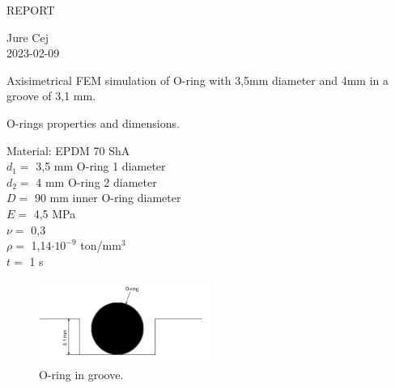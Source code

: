 \documentclass[10pt,a4paper,oneside,fleqn]{article}
\begin{document}
	
	
	\begin{center}
		REPORT
		
		Jure Cej\\
		2023-02-09
	\end{center}


Axisimetrical FEM simulation of O-ring with 3,5mm diameter and 4mm in a groove of 3,1 mm.



O-rings properties and dimensions.

Material: EPDM 70 ShA \\
$d_1 =$ 3,5 mm O-ring 1 diameter\\
$d_2 =$ 4 mm O-ring 2 diameter\\
$D =$ 90 mm inner O-ring diameter\\
$E =$ 4,5 MPa\\
$\nu =$ 0,3 \\
$\rho = $ 1,14$\cdot10^{-9}$ ton/mm$^3$ \\
$t =$ 1 s


\begin{figure}[h]
	\centering
	\includegraphics[width=0.5\textwidth]{2023-02-09-O-ring}
	\caption{O-ring in groove.}
	\label{fig:2023-02-09-O-ring}
\end{figure}
\end{document}
